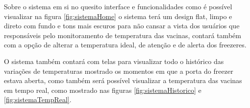     Sobre o sistema em si no quesito interface e funcionalidades
    como é possível visualizar na figura \ref{fig:sistemaHome}
    o sistema terá um design flat, limpo e direto com fundo e 
    tons mais escuros para não cansar a vista dos usuários que 
    responsáveis pelo monitoramento de temperatura das vacinas,
    contará também com a opção de alterar a temperatura ideal,
    de atenção e de alerta dos freezeres.


    O sistema também contará com telas para visualizar todo
    o histórico das variações de temperaturas mostrado os 
    momentos em que a porta do freezer estava aberta, 
    como também será possível visualizar a temperatura 
    das vacinas em tempo real, como mostrado nas figuras
    \ref{fig:sistemaHistorico} e \ref{fig:sistemaTempReal}.

